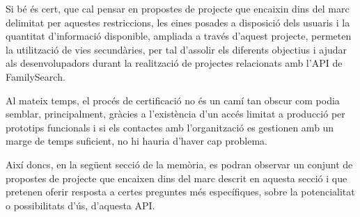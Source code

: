     Si bé és cert, que cal pensar en propostes de projecte que encaixin dins del marc delimitat per aquestes restriccions, les eines posades a disposició dels usuaris i la quantitat d'informació disponible, ampliada a través d'aquest projecte, permeten la utilització de vies secundàries, per tal d'assolir els diferents objectius i ajudar als desenvolupadors durant la realització de projectes relacionats amb l'API de FamilySearch.

    Al mateix temps, el procés de certificació no és un camí tan obscur com podia semblar, principalment, gràcies a l'existència d'un accés limitat a producció per prototips funcionals i si els contactes amb l'organització es gestionen amb un marge de temps suficient, no hi hauria d'haver cap problema.

    Així doncs, en la següent secció de la memòria, es podran observar un conjunt de propostes de projecte que encaixen dins del marc descrit en aquesta secció i que pretenen oferir resposta a certes preguntes més específiques, sobre la potencialitat o possibilitats d'ús, d'aquesta API.
